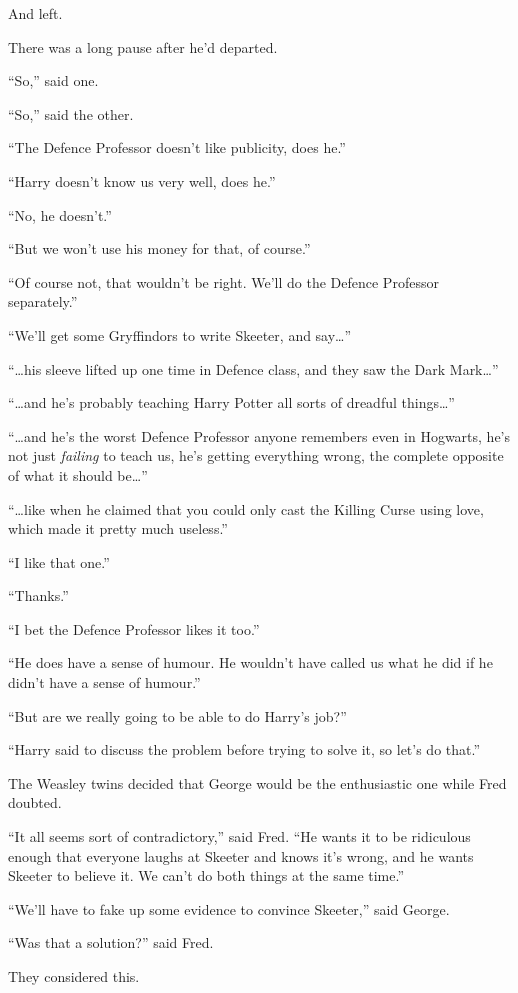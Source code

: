 And left.

There was a long pause after he’d departed.

“So,” said one.

“So,” said the other.

“The Defence Professor doesn’t like publicity, does he.”

“Harry doesn’t know us very well, does he.”

“No, he doesn’t.”

“But we won’t use his money for that, of course.”

“Of course not, that wouldn’t be right. We’ll do the Defence Professor separately.”

“We’ll get some Gryffindors to write Skeeter, and say…”

“…his sleeve lifted up one time in Defence class, and they saw the Dark Mark…”

“…and he’s probably teaching Harry Potter all sorts of dreadful things…”

“…and he’s the worst Defence Professor anyone remembers even in Hogwarts, he’s not just \emph{failing} to teach us, he’s getting everything wrong, the complete opposite of what it should be…”

“…like when he claimed that you could only cast the Killing Curse using love, which made it pretty much useless.”

“I like that one.”

“Thanks.”

“I bet the Defence Professor likes it too.”

“He does have a sense of humour. He wouldn’t have called us what he did if he didn’t have a sense of humour.”

“But are we really going to be able to do Harry’s job?”

“Harry said to discuss the problem before trying to solve it, so let’s do that.”

The Weasley twins decided that George would be the enthusiastic one while Fred doubted.

“It all seems sort of contradictory,” said Fred. “He wants it to be ridiculous enough that everyone laughs at Skeeter and knows it’s wrong, and he wants Skeeter to believe it. We can’t do both things at the same time.”

“We’ll have to fake up some evidence to convince Skeeter,” said George.

“Was that a solution?” said Fred.

They considered this.

